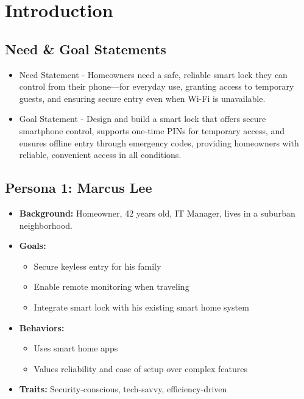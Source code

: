 \newpage

\section{Introduction}

\begin{comment}
 What is required for Introduction:
 - Need & Goal statement
 - Personas
 - Research into existing designs / products that meet / partially meet the need
 - Sustainability Statement
\end{comment}


\subsection{Need \& Goal Statements}
\begin{itemize}
    \item Need Statement - Homeowners need a safe, reliable smart lock they can control from their phone—for everyday use, granting access to temporary guests, and ensuring secure entry even when Wi-Fi is unavailable.
    
    \item Goal Statement - Design and build a smart lock that offers secure smartphone control, supports one-time PINs for temporary access, and ensures offline entry through emergency codes, providing homeowners with reliable, convenient access in all conditions.
\end{itemize}


\subsection{Persona 1: Marcus Lee}

\begin{itemize}
    \item \textbf{Background:} Homeowner, 42 years old, IT Manager, lives in a suburban neighborhood.
    \item \textbf{Goals:} 
    \begin{itemize}
        \item Secure keyless entry for his family
        \item Enable remote monitoring when traveling
        \item Integrate smart lock with his existing smart home system
    \end{itemize}
    \item \textbf{Behaviors:}
    \begin{itemize}
        \item Uses smart home apps
        \item Values reliability and ease of setup over complex features
    \end{itemize}
    \item \textbf{Traits:} Security-conscious, tech-savvy, efficiency-driven
\end{itemize}

